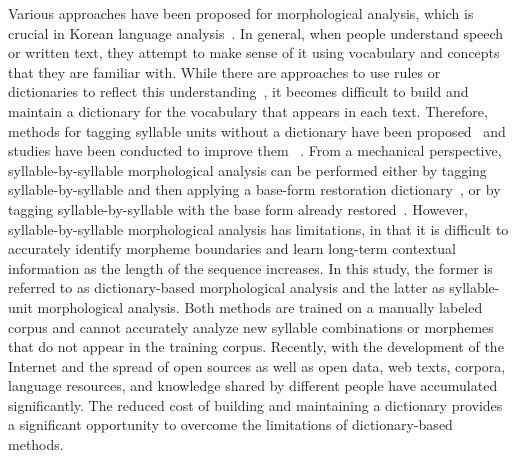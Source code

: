 \documentclass[AMS,STIX2COL]{WileyNJD-v2}
\begin{document}
    Various approaches have been proposed for morphological analysis, which is crucial in Korean language analysis~\cite{KwonHC1991, LeeDG2009, ShimKS2011, LeeJS2011, ShinJC2012, LeeCK2013, NaSH2014, NaSH2015, HwangHS2016, KimHM2016, ChungES2016, LeeCH2016, Li2017, NaSH2018, KimSW2018, ChoiYS2018, MinJW2018, MinJW2019, KimHM2019, SongHJ2019, MinJW2020, SongHJ2020, ChoiYS2020, HwangHS2020, KimHJ2021, YounJY2021, MinJW2022, KimJM2022, ShinHJ2023}.
    In general, when people understand speech or written text, they attempt to make sense of it using vocabulary and concepts that they are familiar with.
    While there are approaches to use rules or dictionaries to reflect this understanding~\cite{KwonHC1991}, it becomes difficult to build and maintain a dictionary for the vocabulary that appears in each text.
    Therefore, methods for tagging syllable units without a dictionary have been proposed~\cite{ShimKS2011, LeeCK2013, LeeCH2016, KimHM2016} and studies have been conducted to improve them ~\cite{KimSW2018, ChoiYS2018, KimHM2019, MinJW2019, SongHJ2019, SongHJ2020, YounJY2021, ShinHJ2023}.
    From a mechanical perspective, syllable-by-syllable morphological analysis can be performed either by tagging syllable-by-syllable and then applying a base-form restoration dictionary~\cite{ShimKS2011, LeeCH2016}, or by tagging syllable-by-syllable with the base form already restored~\cite{YounJY2021}.
    However, syllable-by-syllable morphological analysis has limitations, in that it is difficult to accurately identify morpheme boundaries and learn long-term contextual information as the length of the sequence increases.
    In this study, the former is referred to as dictionary-based morphological analysis and the latter as syllable-unit morphological analysis.
    Both methods are trained on a manually labeled corpus and cannot accurately analyze new syllable combinations or morphemes that do not appear in the training corpus.
    Recently, with the development of the Internet and the spread of open sources as well as open data, web texts, corpora, language resources, and knowledge shared by different people have accumulated significantly.
    The reduced cost of building and maintaining a dictionary provides a significant opportunity to overcome the limitations of dictionary-based methods.
\end{document}

